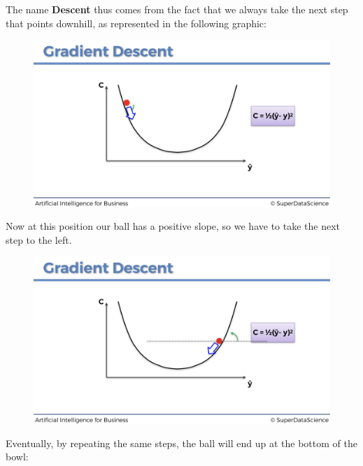 \documentclass[]{book}
\begin{document}
The name \textbf{Descent} thus comes from the fact that we always take the next step that points downhill, as represented in the following graphic:

\begin{figure}[!htbp]
        \begin{center}
            \includegraphics[scale=0.15]{ANN_21.png}
        \end{center}
\end{figure}

Now at this position our ball has a positive slope, so we have to take the next step to the left.

\begin{figure}[!htbp]
        \begin{center}
            \includegraphics[scale=0.15]{ANN_22.png}
        \end{center}
\end{figure}

Eventually, by repeating the same steps, the ball will end up at the bottom of the bowl:
\end{document}
